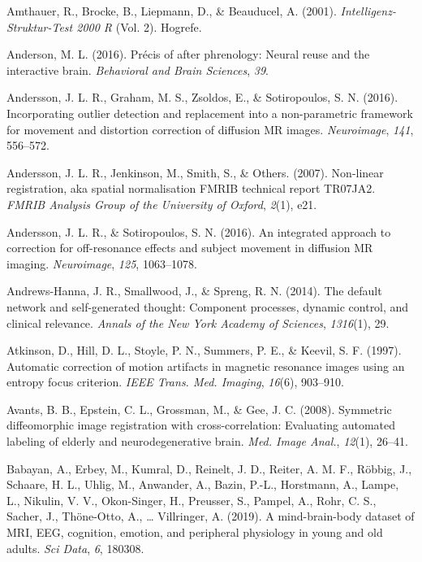 \documentclass[11pt,american,a4paper,oneside,]{memoir} %
\begin{document}
\leavevmode\hypertarget{ref-Amthauer2001-yg}{}%
Amthauer, R., Brocke, B., Liepmann, D., \& Beauducel, A. (2001). \emph{Intelligenz-Struktur-Test 2000 R} (Vol. 2). Hogrefe.

\leavevmode\hypertarget{ref-anderson2016precis}{}%
Anderson, M. L. (2016). Précis of after phrenology: Neural reuse and the interactive brain. \emph{Behavioral and Brain Sciences}, \emph{39}.

\leavevmode\hypertarget{ref-Andersson2016-nm}{}%
Andersson, J. L. R., Graham, M. S., Zsoldos, E., \& Sotiropoulos, S. N. (2016). Incorporating outlier detection and replacement into a non-parametric framework for movement and distortion correction of diffusion MR images. \emph{Neuroimage}, \emph{141}, 556--572.

\leavevmode\hypertarget{ref-Andersson2007-st}{}%
Andersson, J. L. R., Jenkinson, M., Smith, S., \& Others. (2007). Non-linear registration, aka spatial normalisation FMRIB technical report TR07JA2. \emph{FMRIB Analysis Group of the University of Oxford}, \emph{2}(1), e21.

\leavevmode\hypertarget{ref-Andersson2016-pg}{}%
Andersson, J. L. R., \& Sotiropoulos, S. N. (2016). An integrated approach to correction for off-resonance effects and subject movement in diffusion MR imaging. \emph{Neuroimage}, \emph{125}, 1063--1078.

\leavevmode\hypertarget{ref-andrews2014default}{}%
Andrews-Hanna, J. R., Smallwood, J., \& Spreng, R. N. (2014). The default network and self-generated thought: Component processes, dynamic control, and clinical relevance. \emph{Annals of the New York Academy of Sciences}, \emph{1316}(1), 29.

\leavevmode\hypertarget{ref-Atkinson1997-eu}{}%
Atkinson, D., Hill, D. L., Stoyle, P. N., Summers, P. E., \& Keevil, S. F. (1997). Automatic correction of motion artifacts in magnetic resonance images using an entropy focus criterion. \emph{IEEE Trans. Med. Imaging}, \emph{16}(6), 903--910.

\leavevmode\hypertarget{ref-Avants2008-bv}{}%
Avants, B. B., Epstein, C. L., Grossman, M., \& Gee, J. C. (2008). Symmetric diffeomorphic image registration with cross-correlation: Evaluating automated labeling of elderly and neurodegenerative brain. \emph{Med. Image Anal.}, \emph{12}(1), 26--41.

\leavevmode\hypertarget{ref-Babayan2019-mo}{}%
Babayan, A., Erbey, M., Kumral, D., Reinelt, J. D., Reiter, A. M. F., Röbbig, J., Schaare, H. L., Uhlig, M., Anwander, A., Bazin, P.-L., Horstmann, A., Lampe, L., Nikulin, V. V., Okon-Singer, H., Preusser, S., Pampel, A., Rohr, C. S., Sacher, J., Thöne-Otto, A., \ldots{} Villringer, A. (2019). A mind-brain-body dataset of MRI, EEG, cognition, emotion, and peripheral physiology in young and old adults. \emph{Sci Data}, \emph{6}, 180308.
\end{document}
